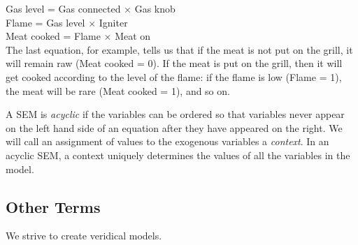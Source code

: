 Gas level = Gas connected $\times$ Gas knob \\
Flame = Gas level  $\times$ Igniter \\
Meat cooked = Flame  $\times$ Meat on \\

\pn The last equation, for example, tells us that if the meat is not put on the grill, it will remain raw (Meat cooked = 0). If the meat is put on the grill, then it will get cooked according to the level of the flame: if the flame is low (Flame = 1), the meat will be rare (Meat cooked = 1), and so on.

\pn A SEM is \emph{acyclic} if the variables can be ordered so that variables never appear on the left hand side of an equation after they have appeared on the right.  We will call an assignment of values to the exogenous variables a \emph{context}. In an acyclic SEM, a context uniquely determines the values of all the variables in the model.

%
%
%

\subsection{Other Terms}

We strive to create veridical models.

